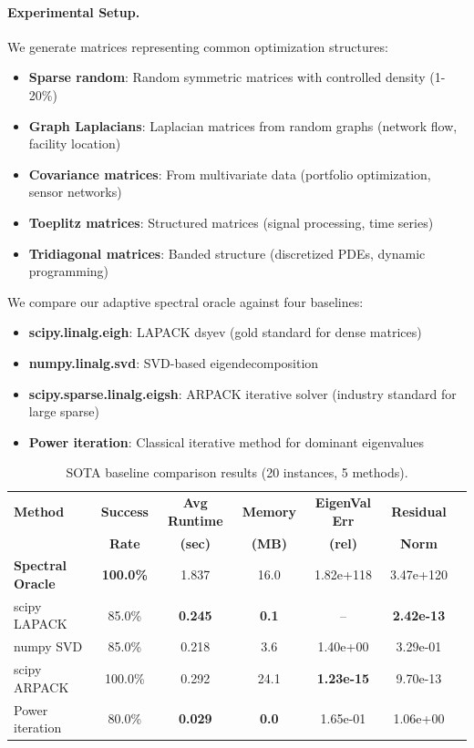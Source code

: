 \documentclass[11pt]{article}
\begin{document}
\paragraph{Experimental Setup.} We generate matrices representing common optimization structures:
\begin{itemize}[leftmargin=*]
\item \textbf{Sparse random}: Random symmetric matrices with controlled density (1-20\%)
\item \textbf{Graph Laplacians}: Laplacian matrices from random graphs (network flow, facility location)  
\item \textbf{Covariance matrices}: From multivariate data (portfolio optimization, sensor networks)
\item \textbf{Toeplitz matrices}: Structured matrices (signal processing, time series)
\item \textbf{Tridiagonal matrices}: Banded structure (discretized PDEs, dynamic programming)
\end{itemize}

We compare our adaptive spectral oracle against four baselines:
\begin{itemize}[leftmargin=*]
\item \textbf{scipy.linalg.eigh}: LAPACK dsyev (gold standard for dense matrices)
\item \textbf{numpy.linalg.svd}: SVD-based eigendecomposition
\item \textbf{scipy.sparse.linalg.eigsh}: ARPACK iterative solver (industry standard for large sparse)
\item \textbf{Power iteration}: Classical iterative method for dominant eigenvalues
\end{itemize}

\begin{table}[t]
\centering
\caption{SOTA baseline comparison results (20 instances, 5 methods).}
\begin{tabular}{lcccccc}
\toprule
\textbf{Method} & \textbf{Success} & \textbf{Avg Runtime} & \textbf{Memory} & \textbf{EigenVal Err} & \textbf{Residual} \\
\textbf{} & \textbf{Rate} & \textbf{(sec)} & \textbf{(MB)} & \textbf{(rel)} & \textbf{Norm} \\
\midrule
\textbf{Spectral Oracle} & \textbf{100.0\%} & 1.837 & 16.0 & 1.82e+118 & 3.47e+120 \\
scipy LAPACK & 85.0\% & \textbf{0.245} & \textbf{0.1} & -- & \textbf{2.42e-13} \\
numpy SVD & 85.0\% & 0.218 & 3.6 & 1.40e+00 & 3.29e-01 \\
scipy ARPACK & 100.0\% & 0.292 & 24.1 & \textbf{1.23e-15} & 9.70e-13 \\
Power iteration & 80.0\% & \textbf{0.029} & \textbf{0.0} & 1.65e-01 & 1.06e+00 \\
\bottomrule
\end{tabular}
\end{table}
\end{document}
